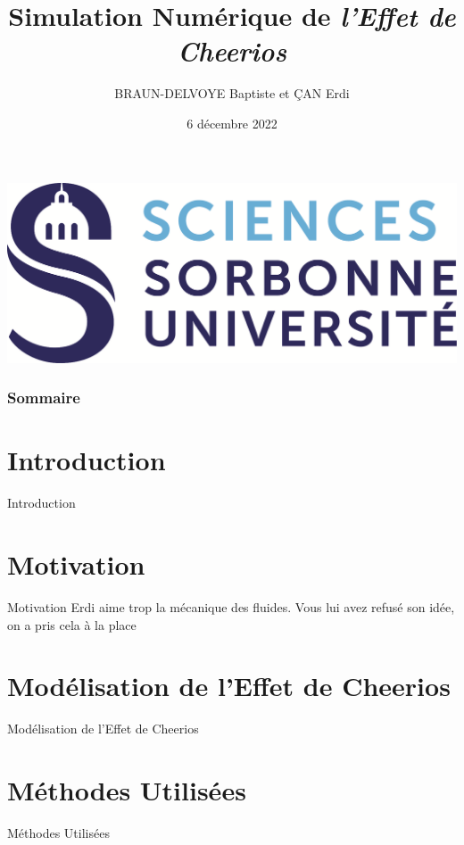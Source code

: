 \documentclass[aspectratio=169,xcolor=dvipsnames]{beamer}
\title[Simulation Numérique de \textit{l'Effet de Cheerios}]{Simulation Numérique de \textit{l'Effet de Cheerios}}
\author[Nous] {BRAUN-DELVOYE  Baptiste et ÇAN Erdi}
\date{6 décembre 2022} %
\institute{Sorbonne Université, CMI Mécanique}
\begin{document}
{
\begin{frame}
    \titlepage
    \centering
    \includegraphics[scale=.2]{SORBONNE_FAC_SCIENCES_DEF_CMJN.png}
\end{frame}
}

\begin{frame}
    \frametitle{Sommaire}
    \tableofcontents
\end{frame}

\section{Introduction}
\begin{frame}{Introduction}%
    
\end{frame}

\section{Motivation}
\begin{frame}{Motivation}
    Erdi aime trop la mécanique des fluides. Vous lui avez refusé son idée, on a pris cela à la place
\end{frame}

\section{Modélisation de l'Effet de Cheerios}
\begin{frame}{Modélisation de l'Effet de Cheerios}
    
\end{frame}

\section{Méthodes Utilisées}
\begin{frame}{Méthodes Utilisées}
    
\end{frame}
\end{document}
